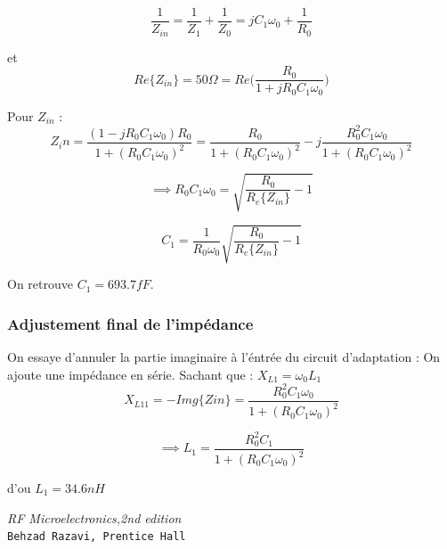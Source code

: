 \documentclass[a4paper]{article}
\begin{document}
\[
\frac{1}{Z_{in}} =\frac{1}{Z_1} + \frac{1}{Z_0} = jC_1\omega_0 + \frac{1}{R_0}
\]

et
\[
Re\{Z_{in}\} = 50 \Omega = Re\bigg(\frac{R_0}{1+ j R_0 C_1 \omega_0}\bigg)
\]

Pour $Z_{in}$ :
\[
Z_in = \frac{(1 - j R_0 C_1 \omega_0) R_0}{1 + (R_0 C_1 \omega_0)^2} =\frac{R_0}{1 + (R_0 C_1 \omega_0)^2} - j \frac{R^2_0 C_1 \omega_0} {1 + (R_0 C_1 \omega_0)^2}
\]

\[
\implies R_0 C_1 \omega_0 = \sqrt{\frac{R_0}{R_e\{Z_{in}\}} - 1}
\]

\[
 C_1  = \frac{1}{R_0 \omega_0}\sqrt{\frac{R_0}{R_e\{Z_{in}\}} - 1}
\]

On retrouve $ C_1 = 693.7 fF$.

\subsubsection{Adjustement final de l'imp\'edance}
On essaye d'annuler la partie imaginaire \`a l'\'entr\'ee du circuit d'adaptation : On ajoute une imp\'edance en s\'erie.
Sachant que : $X_{L1} = \omega_0 L_1$
\[
X_{L11} = - Img\{Zin\} = \frac{R^2_0 C_1 \omega_0} {1 + (R_0 C_1 \omega_0)^2}
\]

\[
\implies L_1 = \frac{R^2_0 C_1} {1 + (R_0 C_1 \omega_0)^2}
\]

d'ou $L_1 = 34.6 nH$

\clearpage
{}

\begin{thebibliography}{9}

\textit{RF Microelectronics,2nd edition}\\
\texttt{Behzad Razavi, Prentice Hall}

\end{thebibliography}
\end{document}
